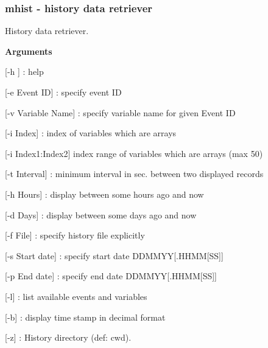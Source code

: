 \par


\par
 \hypertarget{F_History_logging_F_mhist_utility}{}\subsubsection{mhist  -\/ history data retriever}\label{F_History_logging_F_mhist_utility}
History data retriever.


\begin{DoxyItemize}
\item {\bfseries  Arguments }
\begin{DoxyItemize}
\item \mbox{[}-\/h \mbox{]} : help
\item \mbox{[}-\/e Event ID\mbox{]} : specify event ID
\item \mbox{[}-\/v Variable Name\mbox{]} : specify variable name for given Event ID
\item \mbox{[}-\/i Index\mbox{]} : index of variables which are arrays
\item \mbox{[}-\/i Index1:Index2\mbox{]} index range of variables which are arrays (max 50)
\item \mbox{[}-\/t Interval\mbox{]} : minimum interval in sec. between two displayed records
\item \mbox{[}-\/h Hours\mbox{]} : display between some hours ago and now
\item \mbox{[}-\/d Days\mbox{]} : display between some days ago and now
\item \mbox{[}-\/f File\mbox{]} : specify history file explicitly
\item \mbox{[}-\/s Start date\mbox{]} : specify start date DDMMYY\mbox{[}.HHMM\mbox{[}SS\mbox{]}\mbox{]}
\item \mbox{[}-\/p End date\mbox{]} : specify end date DDMMYY\mbox{[}.HHMM\mbox{[}SS\mbox{]}\mbox{]}
\item \mbox{[}-\/l\mbox{]} : list available events and variables
\item \mbox{[}-\/b\mbox{]} : display time stamp in decimal format
\item \mbox{[}-\/z\mbox{]} : History directory (def: cwd).
\end{DoxyItemize}
\end{DoxyItemize}


